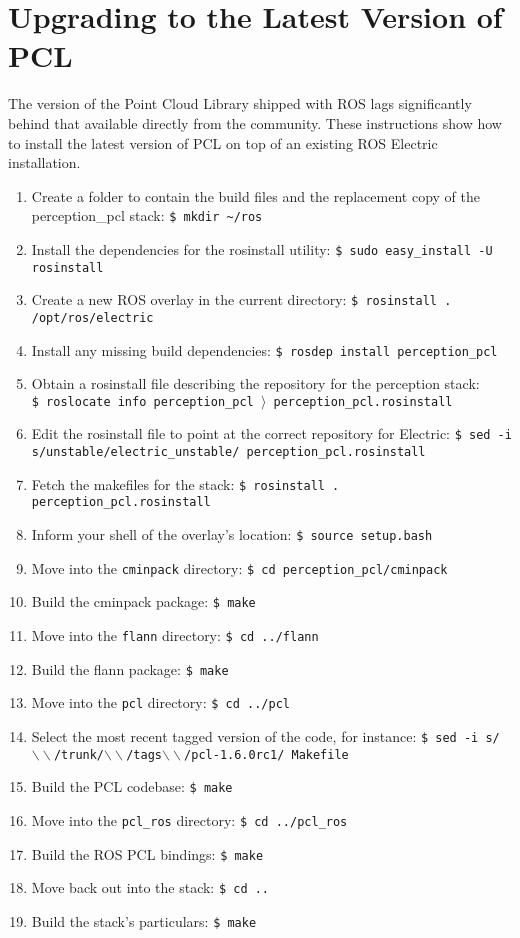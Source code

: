 \documentclass[12pt]{report}
\begin{document}
\section{Upgrading to the Latest Version of PCL}
The version of the Point Cloud Library shipped with ROS lags significantly behind that available directly from the community.  These instructions show how to install the latest version of PCL on top of an existing ROS Electric installation.
\begin{enumerate}
\item{Create a folder to contain the build files and the replacement copy of the perception\_pcl stack: \texttt{\$\ mkdir \~{}/ros}}
\item{Install the dependencies for the rosinstall utility: \texttt{\$\ sudo easy\_install -U rosinstall}}
\item{Create a new ROS overlay in the current directory: \texttt{\$\ rosinstall . /opt/ros/electric}}
\item{Install any missing build dependencies: \texttt{\$\ rosdep install perception\_pcl}}
\item{Obtain a rosinstall file describing the repository for the perception stack: \texttt{\$\ roslocate info perception\_pcl $\rangle$ perception\_pcl.rosinstall}}
\item{Edit the rosinstall file to point at the correct repository for Electric: \texttt{\$\ sed -i s/unstable/electric\_unstable/ perception\_pcl.rosinstall }}
\item{Fetch the makefiles for the stack: \texttt{\$\ rosinstall . perception\_pcl.rosinstall}}
\item{Inform your shell of the overlay's location: \texttt{\$\ source setup.bash}}
\item{Move into the \texttt{cminpack} directory: \texttt{\$\ cd perception\_pcl/cminpack}}
\item{Build the cminpack package: \texttt{\$\ make}}
\item{Move into the \texttt{flann} directory: \texttt{\$\ cd ../flann}}
\item{Build the flann package: \texttt{\$\ make}}
\item{Move into the \texttt{pcl} directory: \texttt{\$\ cd ../pcl}}
\item{Select the most recent tagged version of the code, for instance: \texttt{\$\ sed -i s/$\backslash\backslash$/trunk/$\backslash\backslash$/tags$\backslash\backslash$/pcl-1.6.0rc1/ Makefile}}
\item{Build the PCL codebase: \texttt{\$\ make}}
\item{Move into the \texttt{pcl\_ros} directory: \texttt{\$\ cd ../pcl\_ros}}
\item{Build the ROS PCL bindings: \texttt{\$\ make}}
\item{Move back out into the stack: \texttt{\$\ cd ..}}
\item{Build the stack's particulars: \texttt{\$\ make}}
\end{enumerate}
\end{document}
